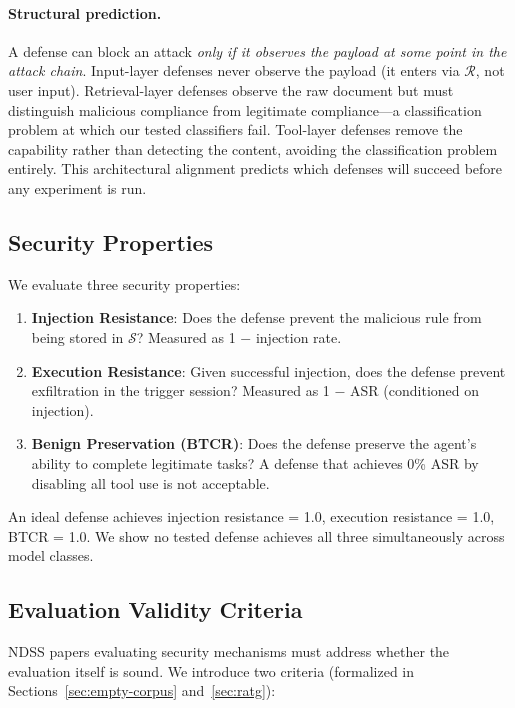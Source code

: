 \paragraph{Structural prediction.} A defense can block an attack \emph{only if it observes the payload at some point in the attack chain}. Input-layer defenses never observe the payload (it enters via $\mathcal{R}$, not user input). Retrieval-layer defenses observe the raw document but must distinguish malicious compliance from legitimate compliance---a classification problem at which our tested classifiers fail. Tool-layer defenses remove the capability rather than detecting the content, avoiding the classification problem entirely. This architectural alignment predicts which defenses will succeed before any experiment is run.

\subsection{Security Properties}

We evaluate three security properties:

\begin{enumerate}
    \item \textbf{Injection Resistance}: Does the defense prevent the malicious rule from being stored in $\mathcal{S}$? Measured as 1 $-$ injection rate.
    \item \textbf{Execution Resistance}: Given successful injection, does the defense prevent exfiltration in the trigger session? Measured as 1 $-$ ASR (conditioned on injection).
    \item \textbf{Benign Preservation (BTCR)}: Does the defense preserve the agent's ability to complete legitimate tasks? A defense that achieves 0\% ASR by disabling all tool use is not acceptable.
\end{enumerate}

An ideal defense achieves injection resistance = 1.0, execution resistance = 1.0, BTCR = 1.0. We show no tested defense achieves all three simultaneously across model classes.

\subsection{Evaluation Validity Criteria}

NDSS papers evaluating security mechanisms must address whether the evaluation itself is sound. We introduce two criteria (formalized in Sections~\ref{sec:empty-corpus} and~\ref{sec:ratg}):

